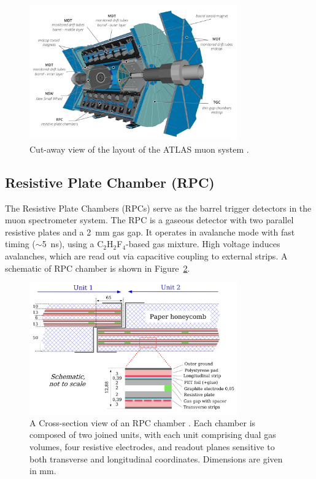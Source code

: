 \begin{figure}[htbp]
  \centering
  \includegraphics[width=0.8\textwidth]{figs/chapter2/muon_system.png}
  \caption{Cut-away view of the layout of the ATLAS muon system \cite{ATLASRun3Detector}.}
  \label{fig:muon_system}
\end{figure}

\subsection{Resistive Plate Chamber (RPC)}
The Resistive Plate Chambers (RPCs) serve as the barrel trigger detectors in the muon spectrometer system. The RPC is a gaseous detector with two parallel resistive plates and a 2~mm gas gap. It operates in avalanche mode with fast timing ($\sim$5~ns), using a C$_2$H$_2$F$_4$-based gas mixture. High voltage induces avalanches, which are read out via capacitive coupling to external strips. A schematic of RPC chamber is shown in Figure~\ref{fig:RPC_cross_section}.

\begin{figure}[htbp]
  \centering
  \includegraphics[width=0.8\textwidth]{figs/chapter2/RPC_cross_section.png}
  \caption{A Cross-section view of an RPC chamber \cite{ATLASDetector2008}. Each chamber is composed of two joined units, with each unit comprising dual gas volumes, four resistive electrodes, and readout planes sensitive to both transverse and longitudinal coordinates. Dimensions are given in mm.}
  \label{fig:RPC_cross_section}
\end{figure}

